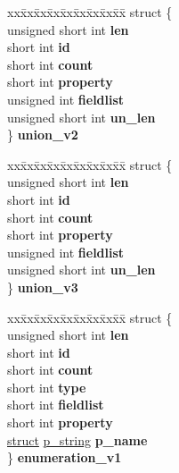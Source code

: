 \begin{DoxyCompactItemize}
\begin{tabbing}
\end{tabbing}\item 
\mbox{\label{unioncodeview__type_ae6b94eea678ab521620c4f48bd30124c}} 
\begin{tabbing}
xx\=xx\=xx\=xx\=xx\=xx\=xx\=xx\=xx\=\kill
struct \{\\
\>unsigned short int {\bfseries len}\\
\>short int {\bfseries id}\\
\>short int {\bfseries count}\\
\>short int {\bfseries property}\\
\>unsigned int {\bfseries fieldlist}\\
\>unsigned short int {\bfseries un\_len}\\
\} {\bfseries union\_v2}\\

\end{tabbing}\item 
\mbox{\label{unioncodeview__type_a1a917aeb1e809bbdd4d70a263e9864bf}} 
\begin{tabbing}
xx\=xx\=xx\=xx\=xx\=xx\=xx\=xx\=xx\=\kill
struct \{\\
\>unsigned short int {\bfseries len}\\
\>short int {\bfseries id}\\
\>short int {\bfseries count}\\
\>short int {\bfseries property}\\
\>unsigned int {\bfseries fieldlist}\\
\>unsigned short int {\bfseries un\_len}\\
\} {\bfseries union\_v3}\\

\end{tabbing}\item 
\mbox{\label{unioncodeview__type_ab3ae47be66931980c67067852704fc32}} 
\begin{tabbing}
xx\=xx\=xx\=xx\=xx\=xx\=xx\=xx\=xx\=\kill
struct \{\\
\>unsigned short int {\bfseries len}\\
\>short int {\bfseries id}\\
\>short int {\bfseries count}\\
\>short int {\bfseries type}\\
\>short int {\bfseries fieldlist}\\
\>short int {\bfseries property}\\
\>\hyperlink{interfacestruct}{struct} \hyperlink{structp__string}{p\_string} {\bfseries p\_name}\\
\} {\bfseries enumeration\_v1}\\


\end{tabbing}
\end{DoxyCompactItemize}
